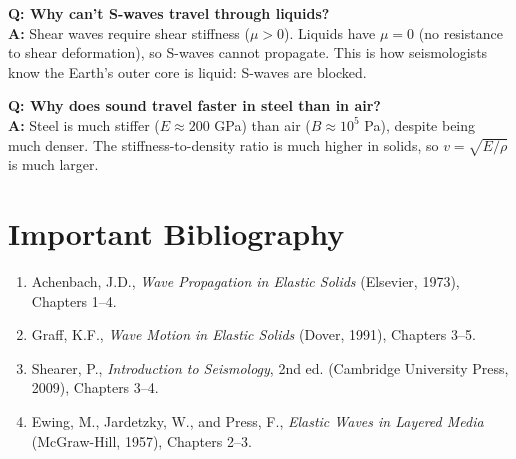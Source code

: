 \textbf{Q: Why can't S-waves travel through liquids?}\\
\textbf{A:} Shear waves require shear stiffness ($\mu > 0$). Liquids have $\mu = 0$ (no resistance to shear deformation), so S-waves cannot propagate. This is how seismologists know the Earth's outer core is liquid: S-waves are blocked.

\textbf{Q: Why does sound travel faster in steel than in air?}\\
\textbf{A:} Steel is much stiffer ($E \approx 200$ GPa) than air ($B \approx 10^5$ Pa), despite being much denser. The stiffness-to-density ratio is much higher in solids, so $v = \sqrt{E/\rho}$ is much larger.
\section*{Important Bibliography}

\begin{enumerate}
\item Achenbach, J.D., \textit{Wave Propagation in Elastic Solids} (Elsevier, 1973), Chapters 1--4.
\item Graff, K.F., \textit{Wave Motion in Elastic Solids} (Dover, 1991), Chapters 3--5.
\item Shearer, P., \textit{Introduction to Seismology}, 2nd ed. (Cambridge University Press, 2009), Chapters 3--4.
\item Ewing, M., Jardetzky, W., and Press, F., \textit{Elastic Waves in Layered Media} (McGraw-Hill, 1957), Chapters 2--3.
\end{enumerate}


